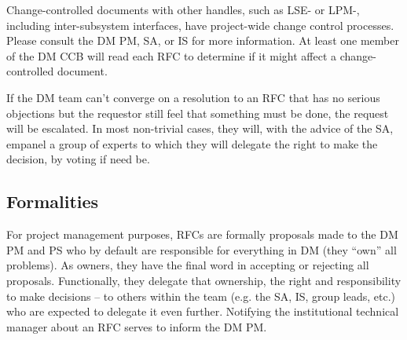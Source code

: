 Change-controlled documents with other handles, such as LSE- or LPM-, including inter-subsystem interfaces, have project-wide change control processes. Please consult the DM PM, SA, or IS for more information.
At least one member of the DM CCB will read each RFC to determine if it might affect a change-controlled document.

If the DM team can't converge on a resolution to an RFC that has no serious objections but the requestor still feel that something must be done, the request will be escalated. In most non-trivial cases, they will, with the advice of the SA, empanel a group of experts to which they will delegate the right to make the decision, by voting if need be.

\subsection{Formalities}
For project management purposes, RFCs are formally proposals made to the DM PM and PS who by default are responsible for everything in DM (they ``own'' all problems). As owners, they have the final word in accepting or rejecting all proposals. Functionally, they delegate that ownership, the right and responsibility to make decisions -- to others within the team (e.g. the SA, IS, group leads, etc.) who are expected to delegate it even further. Notifying the institutional technical manager about an RFC serves to inform the DM PM.
